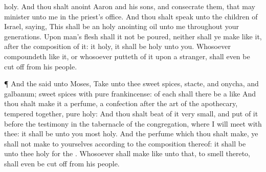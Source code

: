 {holy.
And thou shalt
anoint
Aaron and his
sons, and
consecrate them, that
{} may minister unto me in the
priest’s office.
And thou shalt
speak unto the
children of
Israel,
saying, This shall be an
holy
anointing
oil unto me throughout your
generations.
Upon
man’s
flesh shall it not be
poured, neither shall ye
make
{} like it, after the
composition of it: it
{}
holy,
{} it shall be
holy unto you.
Whosoever
compoundeth
{} like it, or whosoever
putteth
{} of it upon a
stranger, shall even be
cut off from his
people.
\par }{\PP {}¶ And the
{}
said unto
Moses,
Take unto thee sweet
spices,
stacte, and
onycha, and
galbanum;
{}
sweet
spices with
pure
frankincense: of
each shall there be a
like
{}
And thou shalt
make it a
perfume, a
confection after the
art of the
apothecary,
tempered together,
pure
{}
holy:
And thou shalt
beat
{} of it very
small, and
put of it
before the
testimony in the
tabernacle of the
congregation, where I will
meet with thee: it shall be unto you
most
holy.
And
{} the
perfume which thou shalt
make, ye shall not
make to yourselves according to the
composition thereof: it shall be unto thee
holy for the
{}.
Whosoever shall
make like unto that, to
smell thereto, shall even be cut
off from his
people.

}
